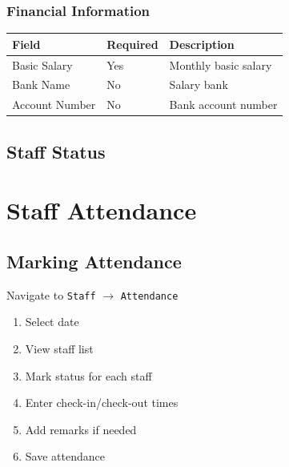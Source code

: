\documentclass[12pt,a4paper]{report}
\begin{document}
\subsection{Financial Information}

\begin{longtable}{@{}p{4cm}p{3cm}p{6cm}@{}}
\toprule
\textbf{Field} & \textbf{Required} & \textbf{Description} \\
\midrule
\endhead
Basic Salary & Yes & Monthly basic salary \\
Bank Name & No & Salary bank \\
Account Number & No & Bank account number \\
\bottomrule
\end{longtable}

\section{Staff Status}

\begin{center}
\end{center}

\chapter{Staff Attendance}

\section{Marking Attendance}

Navigate to \texttt{Staff} $\rightarrow$ \texttt{Attendance}

\begin{enumerate}[leftmargin=*]
    \item Select date
    \item View staff list
    \item Mark status for each staff
    \item Enter check-in/check-out times
    \item Add remarks if needed
    \item Save attendance
\end{enumerate}
\end{document}
